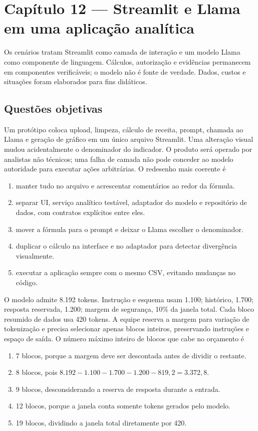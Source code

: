 \section{Capítulo 12 --- Streamlit e Llama em uma aplicação analítica}

Os cenários tratam Streamlit como camada de interação e um modelo Llama como componente de linguagem. Cálculos, autorização e evidências permanecem em componentes verificáveis; o modelo não é fonte de verdade. Dados, custos e situações foram elaborados para fins didáticos.

\subsection{Questões objetivas}

\TextoBase
Um protótipo coloca upload, limpeza, cálculo de receita, prompt, chamada ao Llama e geração de gráfico em um único arquivo Streamlit. Uma alteração visual mudou acidentalmente o denominador do indicador.
O produto será operado por analistas não técnicos; uma falha de camada não pode conceder ao modelo autoridade para executar ações arbitrárias.
\FonteDidatica
\Comando O redesenho mais coerente é
\begin{enumerate}[label=\Alph*)]
\item manter tudo no arquivo e acrescentar comentários ao redor da fórmula.
\item separar UI, serviço analítico testável, adaptador do modelo e repositório de dados, com contratos explícitos entre eles.
\item mover a fórmula para o prompt e deixar o Llama escolher o denominador.
\item duplicar o cálculo na interface e no adaptador para detectar divergência visualmente.
\item executar a aplicação sempre com o mesmo CSV, evitando mudanças no código.
\end{enumerate}

\TextoBase
O modelo admite 8.192 tokens. Instrução e esquema usam 1.100; histórico, 1.700; resposta reservada, 1.200; margem de segurança, 10\% da janela total. Cada bloco resumido de dados usa 420 tokens.
A equipe reserva a margem para variação de tokenização e precisa selecionar apenas blocos inteiros, preservando instruções e espaço de saída.
\FonteDidatica
\Comando O número máximo inteiro de blocos que cabe no orçamento é
\begin{enumerate}[label=\Alph*)]
\item 7 blocos, porque a margem deve ser descontada antes de dividir o restante.
\item 8 blocos, pois $8.192-1.100-1.700-1.200-819{,}2=3.372{,}8$.
\item 9 blocos, desconsiderando a reserva de resposta durante a entrada.
\item 12 blocos, porque a janela conta somente tokens gerados pelo modelo.
\item 19 blocos, dividindo a janela total diretamente por 420.
\end{enumerate}

